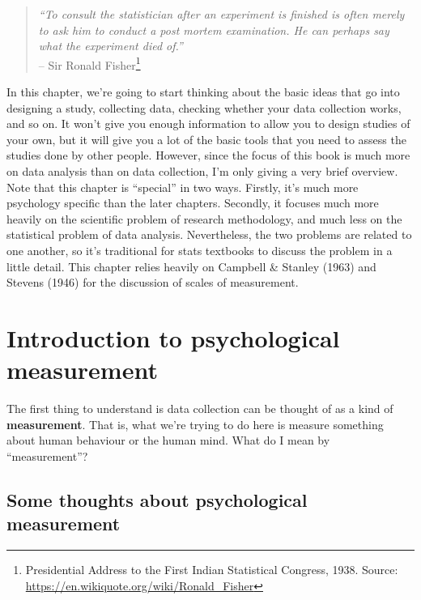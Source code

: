 \documentclass[
  a4paper,
]{book}
\begin{document}
\begin{quote}
\emph{``To consult the statistician after an experiment is finished is
often merely to ask him to conduct a post mortem examination. He can
perhaps say what the experiment died of.''}\\
-- Sir Ronald Fisher\footnote{Presidential Address to the First Indian
  Statistical Congress, 1938. Source:
  \url{https://en.wikiquote.org/wiki/Ronald_Fisher}}
\end{quote}

In this chapter, we're going to start thinking about the basic ideas
that go into designing a study, collecting data, checking whether your
data collection works, and so on. It won't give you enough information
to allow you to design studies of your own, but it will give you a lot
of the basic tools that you need to assess the studies done by other
people. However, since the focus of this book is much more on data
analysis than on data collection, I'm only giving a very brief overview.
Note that this chapter is ``special'' in two ways. Firstly, it's much
more psychology specific than the later chapters. Secondly, it focuses
much more heavily on the scientific problem of research methodology, and
much less on the statistical problem of data analysis. Nevertheless, the
two problems are related to one another, so it's traditional for stats
textbooks to discuss the problem in a little detail. This chapter relies
heavily on Campbell \& Stanley (1963) and Stevens (1946) for the
discussion of scales of measurement.

\hypertarget{sec-Introduction-to-psychological-measurement}{%
\section{Introduction to psychological
measurement}\label{sec-Introduction-to-psychological-measurement}}

The first thing to understand is data collection can be thought of as a
kind of \textbf{measurement}. That is, what we're trying to do here is
measure something about human behaviour or the human mind. What do I
mean by ``measurement''?

\hypertarget{some-thoughts-about-psychological-measurement}{%
\subsection{Some thoughts about psychological
measurement}\label{some-thoughts-about-psychological-measurement}}
\end{document}
